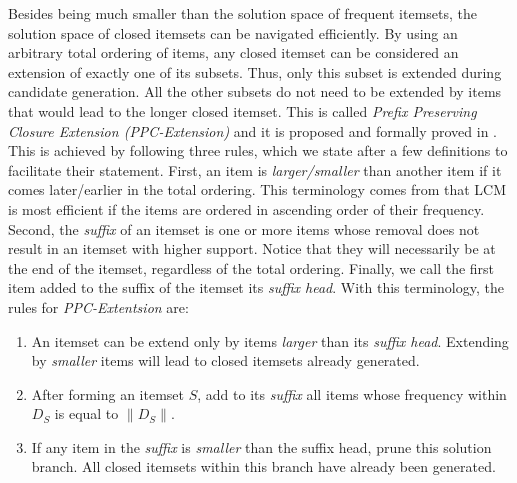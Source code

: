 \documentclass{sig-alternate}
\begin{document}
Besides being much smaller than the solution space of frequent itemsets, the solution space of closed itemsets can be navigated efficiently. By using an arbitrary total ordering of items, any closed itemset can be considered an extension of exactly one of its subsets. Thus, only this subset is extended during candidate generation. All the other subsets do not need to be extended by items that would lead to the longer closed itemset.  This is called \emph{Prefix Preserving Closure Extension (PPC-Extension)} and it is proposed and formally proved in \cite{lcm}. This is achieved by following three rules, which we state after a few definitions to facilitate their statement. First, an item is \emph{larger/smaller} than another item if it comes later/earlier in the total ordering. This terminology comes from that LCM is most efficient if the items are ordered in ascending order of their frequency. Second, the \emph{suffix} of an itemset is one or more items whose removal does not result in an itemset with higher support. Notice that they will necessarily be at the end of the itemset, regardless of the total ordering. Finally, we call the first item added to the suffix of the itemset its \emph{suffix head}. With this terminology, the rules for \emph{PPC-Extentsion} are:
\begin{enumerate}
\item An itemset can be extend only by items \emph{larger} than its \emph{suffix head}. Extending by \emph{smaller} items will lead to closed itemsets already generated.
\item After forming an itemset $S$, add to its \emph{suffix} all items whose frequency within $D_S$ is equal to $\|D_S\|$. %
\item If any item in the \emph{suffix} is \emph{smaller} than the suffix head, prune this solution branch. All closed itemsets within this branch have already been generated.
\end{enumerate}
 
\end{document}

